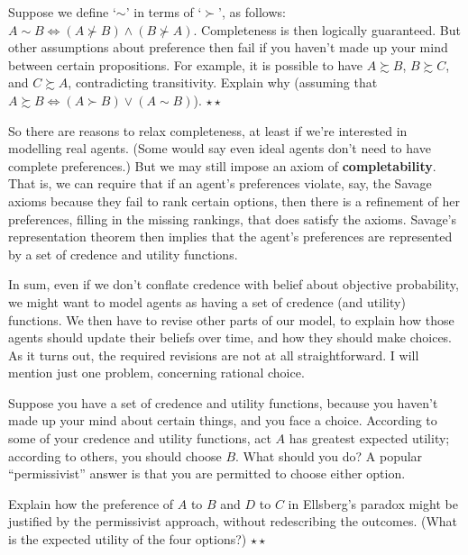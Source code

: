 \begin{exercise}
  Suppose we define `$\sim$' in terms of `$\succ$', as follows: $A\sim
  B \Leftrightarrow (A \not\succ B) \land (B \not\succ
  A)$. Completeness is then logically guaranteed. But other
  assumptions about preference then fail if you haven't made up your
  mind between certain propositions. For example, it is possible to
  have $A \succsim B$, $B \succsim C$, and $C \succsim A$,
  contradicting transitivity. Explain why (assuming that $A \succsim B
  \Leftrightarrow (A \succ B) \lor (A \sim B)$). $\star\star$
\end{exercise}



So there are reasons to relax completeness, at least if we're
interested in modelling real agents. (Some would say even ideal
agents don't need to have complete preferences.) But we may still
impose an axiom of \textbf{completability}. That is, we can require
that if an agent's preferences violate, say, the Savage axioms because
they fail to rank certain options, then there is a refinement of her
preferences, filling in the missing rankings, that does satisfy the
axioms. Savage's representation theorem then implies that the agent's
preferences are represented by a set of credence and utility
functions.

In sum, even if we don't conflate credence with belief about objective
probability, we might want to model agents as having a set of credence
(and utility) functions. We then have to revise other parts of our
model, to explain how those agents should update their beliefs over
time, and how they should make choices. As it turns out, the required
revisions are not at all straightforward. I will mention just one
problem, concerning rational choice. 

Suppose you have a set of credence and utility functions, because you
haven't made up your mind about certain things, and you face a
choice. According to some of your credence and utility functions, act
$A$ has greatest expected utility; according to others, you should
choose $B$. What should you do? A popular ``permissivist'' answer is
that you are permitted to choose either option.

\begin{exercise}
  Explain how the preference of $A$ to $B$ and $D$ to $C$ in
  Ellsberg's paradox might be justified by the permissivist approach,
  without redescribing the outcomes. (What is the expected utility of
  the four options?)  $\star\star$
\end{exercise}

